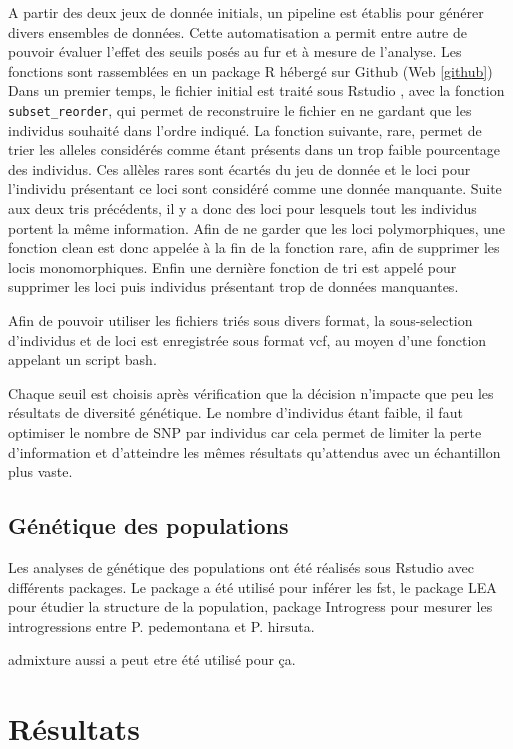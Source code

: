 \documentclass[12pt,a4paper,notitlepage]{article}
\begin{document}
A partir des deux jeux de donnée initials, un pipeline est établis pour générer divers ensembles de données. Cette automatisation a permit entre autre de pouvoir évaluer l'effet des seuils posés au fur et à mesure de l'analyse. Les fonctions sont rassemblées en un package R hébergé sur Github (Web \ref{github})
Dans un premier temps, le fichier initial est traité sous Rstudio \citep{RTeam2017}, avec la fonction \verb|subset_reorder|, qui permet de reconstruire le fichier en ne gardant que les individus souhaité dans l'ordre indiqué. La fonction suivante, rare, permet de trier les alleles considérés comme étant présents dans un trop faible pourcentage des individus. Ces allèles rares sont écartés du jeu de donnée et le loci pour l'individu présentant ce loci sont considéré comme une donnée manquante. Suite aux deux tris précédents, il y a donc des loci pour lesquels tout les individus portent la même information. Afin de ne garder que les loci polymorphiques, une fonction clean est donc appelée à la fin de la fonction rare, afin de supprimer les locis monomorphiques.
Enfin une dernière fonction de tri est appelé pour supprimer les loci puis individus présentant trop de données manquantes.

Afin de pouvoir utiliser les fichiers triés sous divers format, la sous-selection d'individus et de loci est enregistrée sous format vcf, au moyen d'une fonction appelant un script bash. 


Chaque seuil est choisis après vérification que la décision n'impacte que peu les résultats de diversité génétique.
Le nombre d'individus étant faible, il faut optimiser le nombre de SNP par individus car cela permet de limiter la perte d'information et d'atteindre les mêmes résultats qu'attendus avec un échantillon plus vaste. \citep{Nazareno2017}

\subsection{Génétique des populations}

Les analyses de génétique des populations ont été réalisés sous Rstudio \citep{RTeam2017} avec différents packages. Le package a été utilisé pour inférer les fst, le package LEA pour étudier la structure de la population, package Introgress pour mesurer les introgressions entre P. pedemontana et P. hirsuta.

admixture aussi a peut etre été utilisé pour ça.

\section{Résultats}
\end{document}

